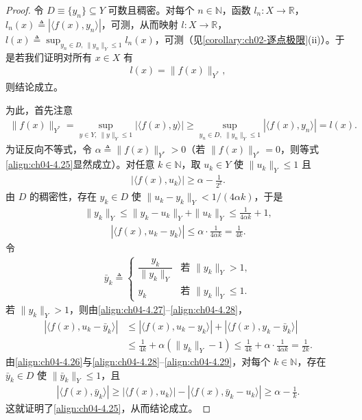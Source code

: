 \documentclass[../../main.tex]{subfiles}%
\begin{document}
\begin{proof}
令 $D\equiv\{y_n\}\subseteq Y$ 可数且稠密。对每个 $n\in\mathbb{N}$，函数 $l_n:X\to\mathbb{R}$，$l_n(x)\triangleq |\langle f(x),y_n\rangle|$，可测，从而映射 $l:X\to\mathbb{R}$，$l(x)\triangleq \sup_{y_n\in D,\ \|y_n\|_Y\leqslant1}l_n(x)$，可测（见\cref{corollary:ch02-逐点极限}(ii)）。于是若我们证明对所有 $x\in X$ 有
\begin{align}
l(x)=\|f(x)\|_{Y^*}, \label{align:ch04-4.25}
\end{align}
则结论成立。

为此，首先注意
\begin{align*}
\|f(x)\|_{Y^*}=\sup_{y\in Y,\ \|y\|_Y\leqslant1}|\langle f(x),y\rangle|\geqslant\sup_{y_n\in D,\ \|y_n\|_Y\leqslant1}|\langle f(x),y_n\rangle|=l(x).
\end{align*}
为证反向不等式，令 $\alpha\triangleq \|f(x)\|_{Y^*}>0$（若 $\|f(x)\|_{Y^*}=0$，则等式\eqref{align:ch04-4.25}显然成立）。对任意 $k\in\mathbb{N}$，取 $u_k\in Y$ 使 $\|u_k\|_Y\leqslant1$ 且
\begin{align}
|\langle f(x),u_k\rangle|\geqslant\alpha-\frac1{2^k}. \label{align:ch04-4.26}
\end{align}
由 $D$ 的稠密性，存在 $y_k\in D$ 使 $\|u_k-y_k\|_Y<1/(4\alpha k)$，于是
\begin{align}
\|y_k\|_Y\leqslant\|y_k-u_k\|_Y+\|u_k\|_Y\leqslant\frac1{4\alpha k}+1, \label{align:ch04-4.27}
\end{align}
\begin{align}
|\langle f(x),u_k-y_k\rangle|\leqslant\alpha\cdot\frac1{4\alpha k}=\frac1{4k}. \label{align:ch04-4.28}
\end{align}
令
\begin{align*}
\bar y_k\triangleq 
\begin{cases}
\dfrac{y_k}{\|y_k\|_Y} & \text{若 }\|y_k\|_Y>1,\\
y_k & \text{若 }\|y_k\|_Y\leqslant1.
\end{cases}
\end{align*}
若 $\|y_k\|_Y>1$，则由\eqref{align:ch04-4.27}--\eqref{align:ch04-4.28}，
\begin{align}
|\langle f(x),u_k-\bar y_k\rangle|
&\leqslant|\langle f(x),u_k-y_k\rangle|+|\langle f(x),y_k-\bar y_k\rangle|\nonumber\\
&\leqslant\frac1{4k}+\alpha(\|y_k\|_Y-1)\leqslant\frac1{4k}+\alpha\cdot\frac1{4\alpha k}=\frac1{2k}. \label{align:ch04-4.29}
\end{align}
由\eqref{align:ch04-4.26}与\eqref{align:ch04-4.28}--\eqref{align:ch04-4.29}，对每个 $k\in\mathbb{N}$，存在 $\bar y_k\in D$ 使 $\|\bar y_k\|_Y\leqslant1$，且
\begin{align*}
|\langle f(x),\bar y_k\rangle|\geqslant|\langle f(x),u_k\rangle|-|\langle f(x),\bar y_k-u_k\rangle|\geqslant\alpha-\frac1k.
\end{align*}
这就证明了\eqref{align:ch04-4.25}，从而结论成立。
\end{proof}
\end{document}
